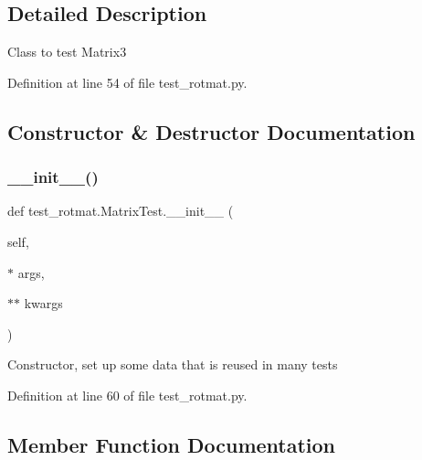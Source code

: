 \subsection{Detailed Description}
\begin{DoxyVerb}Class to test Matrix3
\end{DoxyVerb}
 

Definition at line 54 of file test\+\_\+rotmat.\+py.



\subsection{Constructor \& Destructor Documentation}
\mbox{\label{classtest__rotmat_1_1MatrixTest_ad3451332b0af3615b6aa39909ce01031}} 
\subsubsection{\texorpdfstring{\_\_init\_\_()}{\_\_init\_\_()}}
{\footnotesize\ttfamily def test\+\_\+rotmat.\+Matrix\+Test.\+\_\+\+\_\+init\+\_\+\+\_\+ (\begin{DoxyParamCaption}\item[{}]{self,  }\item[{$\ast$}]{args,  }\item[{$\ast$$\ast$}]{kwargs }\end{DoxyParamCaption})}

\begin{DoxyVerb}Constructor, set up some data that is reused in many tests\end{DoxyVerb}
 

Definition at line 60 of file test\+\_\+rotmat.\+py.



\subsection{Member Function Documentation}
\mbox{\label{classtest__rotmat_1_1MatrixTest_a2252dfc239e943141b12225cbd62a65d}} 
